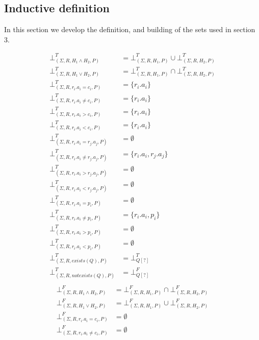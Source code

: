 \subsection{Inductive definition}
In this section we develop the definition, and building of the sets used in section 3.
\begin{mydef}
	\begin{align*}
		\bot^T_{(\Sigma,R,H_1 \land H_2,P)} & = \bot^T_{(\Sigma,R,H_1,P)} \cup \bot^T_{(\Sigma,R,H_2,P)} \\
		\bot^T_{(\Sigma,R,H_1 \lor H_2,P)} & = \bot^T_{(\Sigma,R,H_1,P)} \cap \bot^T_{(\Sigma,R,H_2,P)} \\
		\bot^T_{(\Sigma,R,r_i.a_i = c_i,P)} & = \{r_i.a_i\} \\
		\bot^T_{(\Sigma,R,r_i.a_i \neq c_i,P)} & = \{r_i.a_i\} \\
		\bot^T_{(\Sigma,R,r_i.a_i > c_i,P)} & = \{r_i.a_i\} \\
		\bot^T_{(\Sigma,R,r_i.a_i < c_i,P)} & = \{r_i.a_i\} \\
		\bot^T_{(\Sigma,R,r_i.a_i = r_j.a_j,P)} & = \emptyset \\
		\bot^T_{(\Sigma,R,r_i.a_i \neq r_j.a_j,P)} & = \{r_i.a_i,r_j.a_j\} \\
		\bot^T_{(\Sigma,R,r_i.a_i > r_j.a_j,P)} & = \emptyset \\
		\bot^T_{(\Sigma,R,r_i.a_i < r_j.a_j,P)} & = \emptyset \\
		\bot^T_{(\Sigma,R,r_i.a_i = p_i,P)} & = \emptyset \\
		\bot^T_{(\Sigma,R,r_i.a_i \neq p_i,P)} & = \{r_i.a_i,p_i\} \\
		\bot^T_{(\Sigma,R,r_i.a_i > p_i,P)} & = \emptyset \\
		\bot^T_{(\Sigma,R,r_i.a_i < p_i,P)} & = \emptyset \\
		\bot^T_{(\Sigma,R,exists(Q),P)} & = \bot^T_{Q[?]} \\
		\bot^T_{(\Sigma,R,notexists(Q),P)} & = \bot^F_{Q[?]}\\
	\end{align*}
	\begin{align*}
		\bot^F_{(\Sigma,R,H_1 \land H_2,P)} & = \bot^F_{(\Sigma,R,H_1,P)} \cap \bot^F_{(\Sigma,R,H_2,P)} \\
		\bot^F_{(\Sigma,R,H_1 \lor H_2,P)} & = \bot^F_{(\Sigma,R,H_1,P)} \cup \bot^F_{(\Sigma,R,H_2,P)} \\
		\bot^F_{(\Sigma,R,r_i.a_i = c_i,P)} & =\emptyset \\
		\bot^F_{(\Sigma,R,r_i.a_i \neq c_i,P)} & = \emptyset \\

\end{align*}
\end{mydef}
